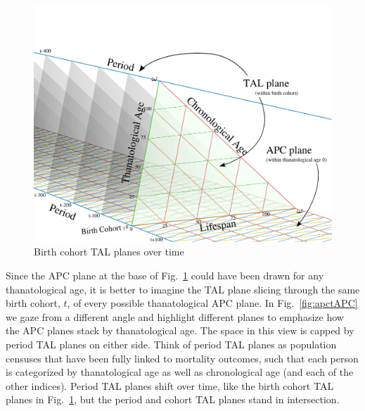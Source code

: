 \documentclass[11pt,oneside,a4paper]{article} %
\begin{document}
\begin{figure}[!h]
\centering
\caption[cap]{Birth cohort TAL planes over time}
\label{fig:apctTAL}
\includegraphics[scale=.5]{Figures/TALisomarkedup.pdf}
\end{figure}

Since the APC plane at the base of Fig.~\ref{fig:apctTAL} could have been
drawn for any thanatological age, it is better to imagine the TAL plane slicing
through the same birth cohort, $t$, of every possible thanatological APC plane.
In Fig.~\ref{fig:apctAPC} we gaze from a different angle and highlight
different planes to emphasize how the APC planes stack by thanatological age. The space in
this view is capped by period TAL planes on either side. Think of period TAL
planes as population censuses that have been fully linked to
mortality outcomes, such that each person is categorized by thanatological
age as well as chronological age (and each of the other indices). Period
TAL planes shift over time, like the birth
cohort TAL planes in Fig.~\ref{fig:apctTAL}, but the period and cohort TAL
planes stand in intersection.
\end{document}
